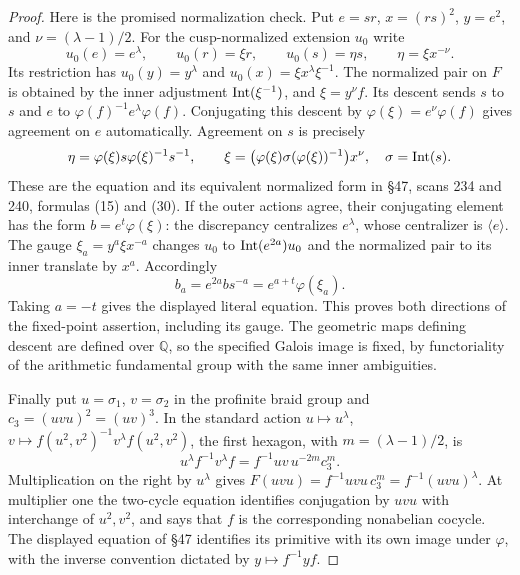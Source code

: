\begin{proof}
Here is the promised normalization check. Put $e=sr$,
$x=(rs)^2$, $y=e^2$, and $\nu=(\lambda-1)/2$. For the cusp-normalized
extension $u_0$ write
\[
 u_0(e)=e^\lambda,\qquad u_0(r)=\xi r,\qquad
 u_0(s)=\eta s,\qquad \eta=\xi x^{-\nu}.
\]
Its restriction has $u_0(y)=y^\lambda$ and
$u_0(x)=\xi x^\lambda\xi^{-1}$. The normalized pair on $F$ is
obtained by the inner adjustment $\operatorname{Int}(\xi^{-1})$, and
$\xi=y^\nu f$. Its descent sends $s$ to $s$ and $e$ to
$\varphi(f)^{-1}e^\lambda\varphi(f)$. Conjugating this descent by
$\varphi(\xi)=e^\nu\varphi(f)$ gives agreement on $e$ automatically.
Agreement on $s$ is precisely
\[
 \eta=\varphi(\xi)s\varphi(\xi)^{-1}s^{-1},\qquad
 \xi=\bigl(\varphi(\xi)\sigma(\varphi(\xi))^{-1}\bigr)x^\nu,
 \quad \sigma=\operatorname{Int}(s).
\]
These are the equation and its equivalent normalized form in
\S47, scans 234 and 240, formulas (15) and (30).
If the outer actions agree, their conjugating element has the form
$b=e^t\varphi(\xi)$: the discrepancy centralizes $e^\lambda$, whose
centralizer is $\langle e\rangle$. The gauge
$\xi_a=y^a\xi x^{-a}$ changes $u_0$ to $\operatorname{Int}(e^{2a})u_0$
and the normalized pair to its inner translate by $x^a$.
Accordingly
\[
 b_a=e^{2a}bs^{-a}=e^{a+t}\varphi(\xi_a).
\]
Taking $a=-t$ gives the displayed literal equation. This proves
both directions of the fixed-point assertion, including its gauge.
The geometric maps defining descent are defined over $\mathbb Q$,
so the specified Galois image is fixed, by functoriality of the
arithmetic fundamental group with the same inner ambiguities.

Finally put $u=\sigma_1$, $v=\sigma_2$ in the profinite braid group
and $c_3=(uvu)^2=(uv)^3$. In the standard action
$u\mapsto u^\lambda$, $v\mapsto f(u^2,v^2)^{-1}v^\lambda f(u^2,v^2)$,
the first hexagon, with $m=(\lambda-1)/2$, is
\[
 u^\lambda f^{-1}v^\lambda f
       =f^{-1}uv\,u^{-2m}c_3^m.
\]
Multiplication on the right by $u^\lambda$ gives
$F(uvu)=f^{-1}uvu\,c_3^m=f^{-1}(uvu)^\lambda$.
At multiplier one the two-cycle equation identifies conjugation
by $uvu$ with interchange of $u^2,v^2$, and says that $f$ is the
corresponding nonabelian cocycle. The displayed equation of
\S47 identifies its primitive with its own image under $\varphi$,
with the inverse convention dictated by $y\mapsto f^{-1}yf$.
\end{proof}

